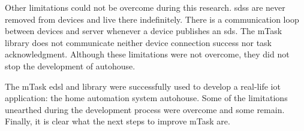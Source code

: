 Other limitations could not be overcome during this research. \acsp{sds} are never removed from devices and live there indefinitely. There is a communication loop between devices and server whenever a device publishes an \acs{sds}. The \gls{mTask} library does not communicate neither device connection success nor task acknowledgment. Although these limitations were not overcome, they did not stop the development of \gls{autohouse}. 

The \gls{mTask} \acs{edsl} and library were successfully used to develop a real-life \acs{iot} application: the home automation system \gls{autohouse}. Some of the limitations unearthed during the development process were overcome and some remain. Finally, it is clear what the next steps to improve \gls{mTask} are.